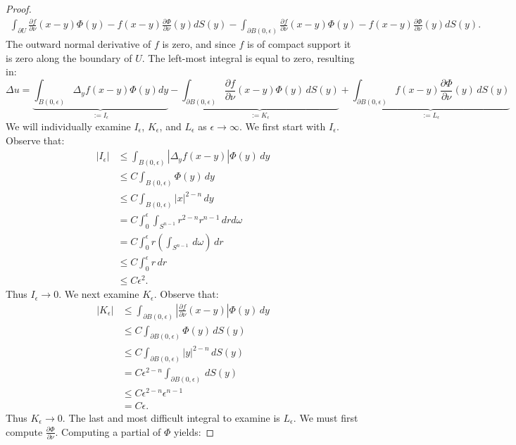 \begin{proof}
		\begin{align*}
			\int_{\partial U}^{} \frac{\partial f}{\partial \nu}(x-y) \Phi(y) - f(x-y) \frac{\partial \Phi}{\partial \nu}(y) dS(y) - \int_{\partial B(0,\epsilon)}^{} \frac{\partial f}{\partial \nu}(x-y) \Phi(y) - f(x-y) \frac{\partial \Phi}{\partial \nu}(y)dS(y). 
		\end{align*}
		The outward normal derivative of $f$ is zero, and since $f$ is of compact support it is zero along the boundary of $U$. The left-most integral is equal to zero, resulting in:
		\[
			\Delta u = \underbrace{\int_{B(0,\epsilon)}^{}\Delta_y f(x-y)\Phi(y)dy}_{:= I_\epsilon} -   \underbrace{\int_{\partial B(0,\epsilon)}^{} \frac{\partial f}{\partial \nu}(x-y) \Phi(y)\,dS(y)}_{:=K_\epsilon} + \underbrace{\int_{\partial B(0,\epsilon)}^{}  f(x-y) \frac{\partial \Phi}{\partial \nu}(y) \,dS(y)}_{:= L_\epsilon}
		\] 
		We will individually examine $I_\epsilon$, $K_\epsilon$, and $L_\epsilon$ as $\epsilon \rightarrow \infty$. We first start with $I_\epsilon$. Observe that:
		\begin{align*}
			|I_\epsilon|
			& \leq \int_{B(0,\epsilon)}^{} |\Delta_y f(x-y)|\Phi(y)\,dy \\
			& \leq C \int_{B(0,\epsilon)}^{} \Phi(y)\,dy \\
			& \leq C \int_{B(0,\epsilon)}^{} |x|^{2-n}\,dy \\
			& = C \int_{0}^{\epsilon} \int_{S^{n-1}}^{} r^{2-n}r^{n-1}\,drd\omega \\
			&= C \int_{0}^{\epsilon} r \left(\int_{S^{n-1}}^{}\,d\omega \right)\,dr \\
			& \leq C \int_{0}^{\epsilon} r\,dr \\
			& \leq C \epsilon^2.
		\end{align*}
		Thus $I_\epsilon \rightarrow 0$. We next examine $K_\epsilon$. Observe that:
		\begin{align*}
			|K_\epsilon|
			& \leq \int_{\partial B(0,\epsilon)}^{} \left| \frac{\partial f}{\partial \nu}(x-y)\right| \Phi(y)\,dy  \\
			& \leq C \int_{\partial B(0,\epsilon)}^{} \Phi(y)\,dS(y) \\
			& \leq C \int_{\partial B(0,\epsilon)}^{} |y|^{2-n}\,dS(y) \\
			& = C \epsilon^{2-n}\int_{\partial B(0,\epsilon)}^{}\,dS(y) \\
			& \leq C\epsilon^{2-n}\epsilon^{n-1} \\
			& = C \epsilon.
		\end{align*}
		Thus $K_\epsilon \rightarrow 0$. The last and most difficult integral to examine is $L_\epsilon$. We must first compute $\frac{\partial \Phi}{\partial \nu}$. Computing a partial of $\Phi$ yields:

\end{proof}
